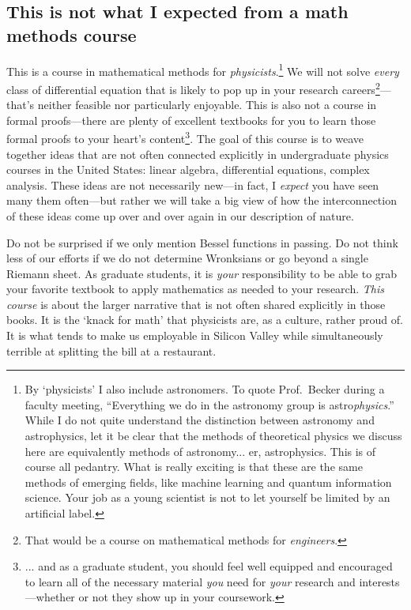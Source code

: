 \subsection{This is not what I expected from a math methods course}

This is a course in mathematical methods for \emph{physicists}.\footnote{By `physicists' I also include astronomers. To quote Prof.~Becker during a faculty meeting, ``Everything we do in the astronomy group is astro\emph{physics}.'' While I do not quite understand the distinction between astronomy and astrophysics, let it be clear that the methods of theoretical physics we discuss here are equivalently methods of astronomy... er, astrophysics. This is of course all pedantry. What is really exciting is that these are the same methods of emerging fields, like machine learning and quantum information science. Your job as a young scientist is not to let yourself be limited by an artificial label.} We will not solve \emph{every} class of differential equation that is likely to pop up in your research careers\footnote{That would be a course on mathematical methods for \emph{engineers}.}---that's neither feasible nor particularly enjoyable. 
%
This is also not a course in formal proofs---there are plenty of excellent textbooks for you to learn those formal proofs to your heart's content\footnote{... and as a graduate student, you should feel well equipped and encouraged to learn all of the necessary material \emph{you} need for \emph{your} research and interests---whether or not they show up in your coursework.}. 
%
The goal of this course is to weave together ideas that are not often connected explicitly in undergraduate physics courses in the United States: linear algebra, differential equations, complex analysis. These ideas are not necessarily new---in fact, I \emph{expect} you have seen many them often---but rather we will take a big view of how the interconnection of these ideas come up over and over again in our description of nature.

Do not be surprised if we only mention Bessel functions in passing. Do not think less of our efforts if we do not determine Wronksians or go beyond a single Riemann sheet. As graduate students, it is \emph{your} responsibility to be able to grab your favorite textbook to apply mathematics as needed to your research. \emph{This course} is about the larger narrative that is not often shared explicitly in those books. It is the `knack for math' that physicists are, as a culture, rather proud of. It is what tends to make us employable in Silicon Valley while simultaneously terrible at splitting the bill at a restaurant. 
 



